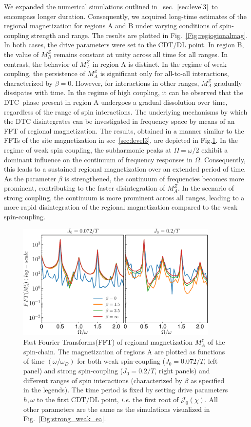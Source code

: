 \documentclass[12pt]{iopart}
\begin{document}
	We expanded the numerical simulations outlined in  sec.~\ref{sec:level3} to encompass longer duration. Consequently, we acquired long-time estimates of the regional magnetization for regions A and B under varying conditions of spin-coupling strength and range. The results are plotted in Fig.~\ref{Fig:regiogionalmag}. In both cases, the drive parameters were set to the CDT/DL point. In region B, the value of $M^Z_B$ remains constant at unity across all time for all ranges. In contrast, the behavior of $M^Z_A$ in region A is distinct. In the regime of weak coupling, the persistence of $M^Z_A$ is significant only for all-to-all interactions, characterized by $\beta=0$. However, for interactions in other ranges, $M^Z_A$ gradually dissipates with time. In the regime of high coupling, it can be observed that the DTC phase present in region A undergoes a gradual dissolution over time, regardless of the range of spin interactions. The underlying mechanisms by which the DTC disintegrates can be investigated in frequency space by means of an FFT of regional magnetization. The results, obtained in a manner similar to the FFTs of the site magnetization in sec~\ref{sec:level3}, are depicted in Fig.\ref{Fig:regionalFFT}. In the regime of weak spin coupling, the subharmonic peaks at $\Omega=\omega/2$ exhibit a dominant influence on the continuum of frequency responses in $\Omega$. Consequently, this leads to a sustained regional magnetization over an extended period of time. As the parameter $\beta$ is strengthened,  the continuum of frequencies becomes more prominent, contributing to the faster disintegration of $M^Z_A$. In the scenario of strong coupling, the continuum is more prominent across all ranges, leading to a more rapid disintegration of the regional magnetization compared to the weak spin-coupling.
	\begin{figure}[t!]
		\centering
		\includegraphics[width = 10cm]{mz_betas.pdf}
		\caption{
			Fast Fourier Transforms(FFT) of regional magnetization $M^z_{A}$ of the spin-chain. The magnetization of regions A are plotted as functions of time $(\omega/\omega_D)$ for both weak spin-coupling ($J_0=0.072/T$, left panel) and strong spin-coupling ($J_0=0.2/T$, right panels) and different ranges of spin interactions (characterized by $\beta$ as specified in the legends). The time period is fixed by setting drive parameters $h,\omega$ to the first CDT/DL point, \textit{i.e.} the first root of $\mathcal{J}_0(\chi)$. All other parameters are the same as the simulations visualized in Fig.~\ref{Fig:strong_weak_ea}.}
		\label{Fig:regionalFFT}
	\end{figure}
	
\end{document}
